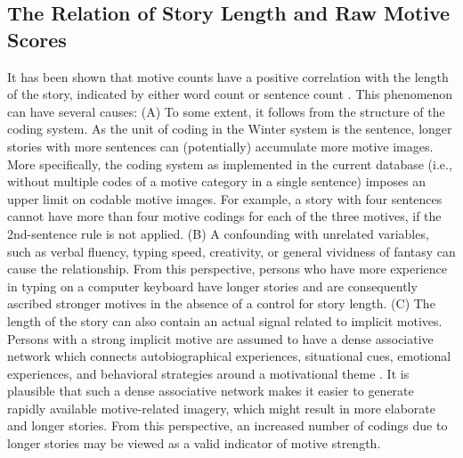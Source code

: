 \documentclass[jou,a4paper]{apa6}\usepackage[]{graphicx}\usepackage[]{color}
\begin{document}
\subsection{The Relation of Story Length and Raw Motive Scores}

It has been shown that motive counts have a positive correlation with the length of the story, indicated by either word count or sentence count \parencite{pang_ContentCodingMethods_2010,schultheiss_MeasuringImplicitMotives_2007}. This phenomenon can have several causes: (A) To some extent, it follows from the structure of the coding system. As the unit of coding in the Winter system is the sentence, longer stories with more sentences can (potentially) accumulate more motive images. More specifically, the coding system as implemented in the current database (i.e., without multiple codes of a motive category in a single sentence) imposes an upper limit on codable motive images. For example, a story with four sentences cannot have more than four motive codings for each of the three motives, if the 2nd-sentence rule is not applied.
(B) A confounding with unrelated variables, such as verbal fluency, typing speed, creativity, or general vividness of fantasy can cause the relationship. From this perspective, persons who have more experience in typing on a computer keyboard have longer stories and are consequently ascribed stronger motives in the absence of a control for story length.
(C) The length of the story can also contain an actual signal related to implicit motives. Persons with a strong implicit motive are assumed to have a dense associative network which connects autobiographical experiences, situational cues, emotional experiences, and behavioral strategies around a motivational theme \parencite{schultheiss_reliability_2008,mcclelland_human_1987}. It is plausible that such a dense associative network makes it easier to generate rapidly available motive-related imagery, which might result in more elaborate and longer stories. From this perspective, an increased number of codings due to longer stories may be viewed as a valid indicator of motive strength.
\end{document}
